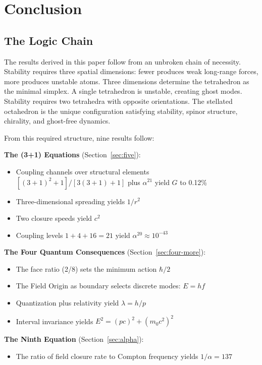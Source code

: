 \documentclass[aps,prd,preprint,superscriptaddress,showpacs,preprintnumbers,amsmath,amssymb,nofootinbib]{revtex4-2}
\begin{document}
\section{Conclusion}
\label{sec:conclusion}

\subsection{The Logic Chain}
\label{subsec:chain}

The results derived in this paper follow from an unbroken chain of necessity. Stability requires three spatial dimensions: fewer produces weak long-range forces, more produces unstable atoms. Three dimensions determine the tetrahedron as the minimal simplex. A single tetrahedron is unstable, creating ghost modes. Stability requires two tetrahedra with opposite orientations. The stellated octahedron is the unique configuration satisfying stability, spinor structure, chirality, and ghost-free dynamics.

From this required structure, nine results follow:

\textbf{The (3+1) Equations} (Section~\ref{sec:five}):
\begin{itemize}
\item Coupling channels over structural elements $[(3+1)^2+1]/[3(3+1)+1]$ plus $\alpha^{21}$ yield $G$ to 0.12\%
\item Three-dimensional spreading yields $1/r^2$
\item Two closure speeds yield $c^2$
\item Coupling levels $1 + 4 + 16 = 21$ yield $\alpha^{20} \approx 10^{-43}$
\end{itemize}

\textbf{The Four Quantum Consequences} (Section~\ref{sec:four-more}):
\begin{itemize}
\item The face ratio (2/8) sets the minimum action $\hbar/2$
\item The Field Origin as boundary selects discrete modes: $E = hf$
\item Quantization plus relativity yield $\lambda = h/p$
\item Interval invariance yields $E^2 = (pc)^2 + (m_0 c^2)^2$
\end{itemize}

\textbf{The Ninth Equation} (Section~\ref{sec:alpha}):
\begin{itemize}
\item The ratio of field closure rate to Compton frequency yields $1/\alpha = 137$
\end{itemize}
\end{document}
